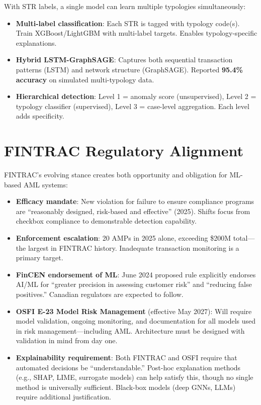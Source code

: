 \documentclass[11pt]{article}
\begin{document}
With STR labels, a single model can learn multiple typologies simultaneously:
\begin{itemize}
\item \textbf{Multi-label classification}: Each STR is tagged with typology code(s). Train XGBoost/LightGBM with multi-label targets. Enables typology-specific explanations.
\item \textbf{Hybrid LSTM-GraphSAGE}: Captures both sequential transaction patterns (LSTM) and network structure (GraphSAGE). Reported \textbf{95.4\% accuracy} on simulated multi-typology data.
\item \textbf{Hierarchical detection}: Level 1 = anomaly score (unsupervised), Level 2 = typology classifier (supervised), Level 3 = case-level aggregation. Each level adds specificity.
\end{itemize}

\section{FINTRAC Regulatory Alignment}

FINTRAC's evolving stance creates both opportunity and obligation for ML-based AML systems:
\begin{itemize}
\item \textbf{Efficacy mandate}: New violation for failure to ensure compliance programs are ``reasonably designed, risk-based and effective'' (2025). Shifts focus from checkbox compliance to demonstrable detection capability.
\item \textbf{Enforcement escalation}: 20 AMPs in 2025 alone, exceeding \$200M total---the largest in FINTRAC history. Inadequate transaction monitoring is a primary target.
\item \textbf{FinCEN endorsement of ML}: June 2024 proposed rule explicitly endorses AI/ML for ``greater precision in assessing customer risk'' and ``reducing false positives.'' Canadian regulators are expected to follow.
\item \textbf{OSFI E-23 Model Risk Management} (effective May 2027): Will require model validation, ongoing monitoring, and documentation for all models used in risk management---including AML. Architecture must be designed with validation in mind from day one.
\item \textbf{Explainability requirement}: Both FINTRAC and OSFI require that automated decisions be ``understandable.'' Post-hoc explanation methods (e.g., SHAP, LIME, surrogate models) can help satisfy this, though no single method is universally sufficient. Black-box models (deep GNNs, LLMs) require additional justification.
\end{itemize}

\bigskip
{}
\end{document}
